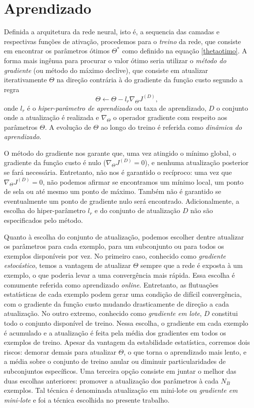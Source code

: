 \section{Aprendizado}\label{sec:aprendizado}

Definida a arquitetura da rede neural, isto é, a sequencia das camadas e respectivas funções de ativação, procedemos para o \textit{treino} da rede, que consiste em encontrar os parâmetros ótimos $\Theta^*$ como definido na equação \ref{thetaotimo}. A forma mais ingênua para procurar o valor ótimo seria utilizar o \textit{método do gradiente} (ou método do máximo declive), que consiste em atualizar iterativamente $\Theta$ na direção contrária à do gradiente da função custo segundo a regra 
\begin{equation}
\Theta \leftarrow \Theta - l_r \nabla_{\Theta} J^{(D)},
\end{equation}
onde $l_r$ é o \textit{hiper-parâmetro de aprendizado} ou taxa de aprendizado, $D$ o conjunto onde a atualização é realizada e $\nabla_{\Theta}$ o operador gradiente com respeito aos parâmetros $\Theta$. A evolução de $\Theta$ ao longo do treino é referida como \textit{dinâmica do aprendizado}.

O método do gradiente nos garante que, uma vez atingido o mínimo global, o gradiente da função custo é nulo ($\nabla_{\Theta} J^{(D)} = 0$), e nenhuma atualização posterior se fará necessária. Entretanto, não nos é garantido o recíproco: uma vez que $\nabla_{\Theta} J^{(D)} = 0$, não podemos afirmar se encontramos um mínimo local, um ponto de sela ou até mesmo um ponto de máximo. Também não é garantido se eventualmente um ponto de gradiente nulo será encontrado. Adicionalmente, a escolha do hiper-parâmetro $l_r$ e do conjunto de atualização $D$ não são especificados pelo método.

Quanto à escolha do conjunto de atualização, podemos escolher dentre atualizar os parâmetros para cada exemplo, para um subconjunto ou para todos os exemplos disponíveis por vez. No primeiro caso, conhecido como \textit{gradiente estocástico}, temos a vantagem de atualizar $\Theta$ sempre que a rede é exposta à um exemplo, o que poderia levar a uma convergência mais rápida. Essa escolha é comumente referida como aprendizado \textit{online}. Entretanto, as flutuações estatísticas de cada exemplo podem gerar uma condição de difícil convergência, com o gradiente da função custo mudando drasticamente de direção a cada atualização. No outro extremo, conhecido como \textit{gradiente em lote}, $D$ constitui todo o conjunto disponível de treino. Nessa escolha, o gradiente em cada exemplo é acumulado e a atualização é feita pela média dos gradientes em todos os exemplos de treino. Apesar da vantagem da estabilidade estatística, corremos dois riscos: demorar demais para atualizar $\Theta$, o que torna o aprendizado mais lento, e a média sobre o conjunto de treino anular ou diminuir particularidades de subconjuntos específicos. Uma terceira opção consiste em juntar o melhor das duas escolhas anteriores: promover a atualização dos parâmetros à cada $N_B$ exemplos. Tal técnica é denominada atualização em mini-lote ou \textit{gradiente em mini-lote} e foi a técnica escolhida no presente trabalho.  

